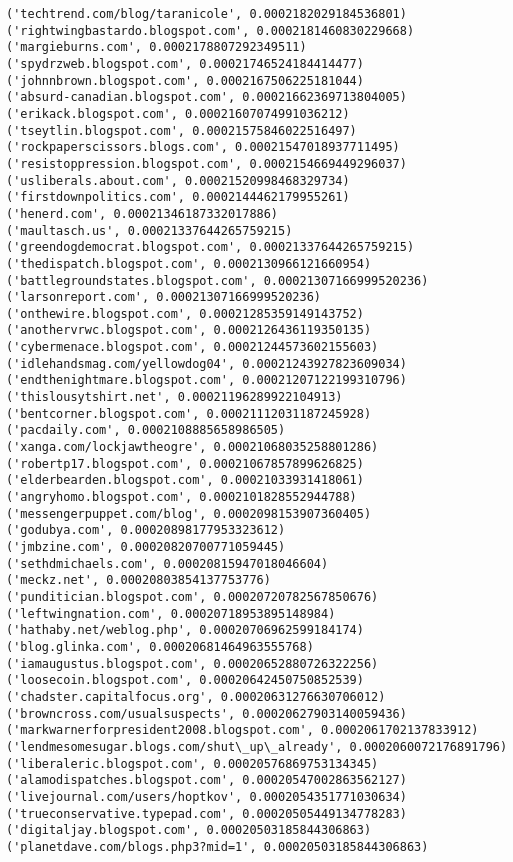 \documentclass[11pt]{article}
\begin{document}
\begin{Verbatim}[commandchars=\\\{\}]
('techtrend.com/blog/taranicole', 0.0002182029184536801)
('rightwingbastardo.blogspot.com', 0.0002181460830229668)
('margieburns.com', 0.0002178807292349511)
('spydrzweb.blogspot.com', 0.00021746524184414477)
('johnnbrown.blogspot.com', 0.0002167506225181044)
('absurd-canadian.blogspot.com', 0.00021662369713804005)
('erikack.blogspot.com', 0.00021607074991036212)
('tseytlin.blogspot.com', 0.00021575846022516497)
('rockpaperscissors.blogs.com', 0.00021547018937711495)
('resistoppression.blogspot.com', 0.0002154669449296037)
('usliberals.about.com', 0.00021520998468329734)
('firstdownpolitics.com', 0.0002144462179955261)
('henerd.com', 0.00021346187332017886)
('maultasch.us', 0.00021337644265759215)
('greendogdemocrat.blogspot.com', 0.00021337644265759215)
('thedispatch.blogspot.com', 0.0002130966121660954)
('battlegroundstates.blogspot.com', 0.00021307166999520236)
('larsonreport.com', 0.00021307166999520236)
('onthewire.blogspot.com', 0.00021285359149143752)
('anothervrwc.blogspot.com', 0.0002126436119350135)
('cybermenace.blogspot.com', 0.00021244573602155603)
('idlehandsmag.com/yellowdog04', 0.00021243927823609034)
('endthenightmare.blogspot.com', 0.00021207122199310796)
('thislousytshirt.net', 0.00021196289922104913)
('bentcorner.blogspot.com', 0.00021112031187245928)
('pacdaily.com', 0.0002108885658986505)
('xanga.com/lockjawtheogre', 0.00021068035258801286)
('robertp17.blogspot.com', 0.00021067857899626825)
('elderbearden.blogspot.com', 0.00021033931418061)
('angryhomo.blogspot.com', 0.0002101828552944788)
('messengerpuppet.com/blog', 0.0002098153907360405)
('godubya.com', 0.00020898177953323612)
('jmbzine.com', 0.00020820700771059445)
('sethdmichaels.com', 0.00020815947018046604)
('meckz.net', 0.00020803854137753776)
('punditician.blogspot.com', 0.00020720782567850676)
('leftwingnation.com', 0.00020718953895148984)
('hathaby.net/weblog.php', 0.00020706962599184174)
('blog.glinka.com', 0.00020681464963555768)
('iamaugustus.blogspot.com', 0.00020652880726322256)
('loosecoin.blogspot.com', 0.00020642450750852539)
('chadster.capitalfocus.org', 0.00020631276630706012)
('browncross.com/usualsuspects', 0.00020627903140059436)
('markwarnerforpresident2008.blogspot.com', 0.0002061702137833912)
('lendmesomesugar.blogs.com/shut\_up\_already', 0.0002060072176891796)
('liberaleric.blogspot.com', 0.00020576869753134345)
('alamodispatches.blogspot.com', 0.00020547002863562127)
('livejournal.com/users/hoptkov', 0.0002054351771030634)
('trueconservative.typepad.com', 0.00020505449134778283)
('digitaljay.blogspot.com', 0.00020503185844306863)
('planetdave.com/blogs.php3?mid=1', 0.00020503185844306863)

\end{Verbatim}
\end{document}
